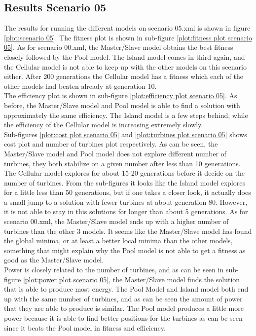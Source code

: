 \subsection{Results Scenario 05}
The results for running the different models on scenario 05.xml is shown in figure \ref{plot:scenario 05}. The fitness plot is shown in sub-figure \ref{plot:fitness plot scenario 05}. As for scenario 00.xml, the Master/Slave model obtains the best fitness closely followed by the Pool model. The Island model comes in third again, and the Cellular model is not able to keep up with the other models on this scenario either. After 200 generations the Cellular model has a fitness which each of the other models had beaten already at generation 10.\\


\noindent The efficiency plot is shown in sub-figure \ref{plot:efficiency plot scenario 05}. As before, the Master/Slave model and Pool model is able to find a solution with approximately the same efficiency. The Island model is a few steps behind, while the efficiency of the Cellular model is increasing extremely slowly. \\


\noindent Sub-figures \ref{plot:cost plot scenario 05} and \ref{plot:turbines plot scenario 05} shows cost plot and number of turbines plot respectively. As can be seen, the Master/Slave model and Pool model does not explore different number of turbines, they both stabilize on a given number after less than 10 generations. The Cellular model explores for about 15-20 generations before it decide on the number of turbines. From the sub-figures it looks like the Island model explores for a little less than 50 generations, but if one takes a closer look, it actually does a small jump to a solution with fewer turbines at about generation 80. However, it is not able to stay in this solutions for longer than about 5 generations. As for scenario 00.xml, the Master/Slave model ends up with a higher number of turbines than the other 3 models. It seems like the Master/Slave model has found the global minima, or at least a better local minima than the other models, something that might explain why the Pool model is not able to get a fitness as good as the Master/Slave model.\\


\noindent Power is closely related to the number of turbines, and as can be seen in sub-figure \ref{plot:power plot scenario 05}, the Master/Slave model finds the solution that is able to produce most energy. The Pool Model and Island model both end up with the same number of turbines, and as can be seen the amount of power that they are able to produce is similar. The Pool model produces a little more power because it is able to find better positions for the turbines as can be seen since it beats the Pool model in fitness and efficiency. \\


